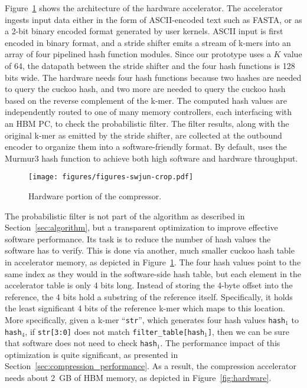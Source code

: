 Figure~\ref{fig:compression_hardware} shows the architecture of the hardware accelerator.
The accelerator ingests input data either in the form of ASCII-encoded text such as FASTA, or as a 2-bit binary encoded format generated by user kernels.
ASCII input is first encoded in binary format, and a stride shifter emits a stream of k-mers into an array of four pipelined hash function modules.
Since our prototype uses a $K$ value of 64, the datapath between the stride shifter and the four hash functions is 128 bits wide.
The hardware needs four hash functions because two hashes are needed to query the cuckoo hash, and two more are needed to query the cuckoo hash based on the reverse complement of the k-mer.
The computed hash values are independently routed to one of many memory controllers, each interfacing with an HBM PC, to check the probabilistic filter.
The filter results, along with the original k-mer as emitted by the stride shifter, are collected at the outbound encoder to organize them into a software-friendly format.
By default, \name{} uses the Murmur3 hash function to achieve both high software and hardware throughput.

\begin{figure}[htb]
    \centering
    \texttt{[image: figures/figures-swjun-crop.pdf]}
    \caption{Hardware portion of the compressor.}
    \label{fig:compression_hardware}
\end{figure}

The probabilistic filter is not part of the algorithm as described in Section~\ref{sec:algorithm}, but a transparent optimization to improve effective software performance.
Its task is to reduce the number of hash values the software has to verify.
This is done via another, much smaller cuckoo hash table in accelerator memory, as depicted in Figure~\ref{fig:compression_hardware}.
The four hash values point to the same index as they would in the software-side hash table, but each element in the accelerator table is only 4 bits long.
Instead of storing the 4-byte offset into the reference, the 4 bits hold a substring of the reference itself.
Specifically, it holds the least significant 4 bits of the reference k-mer which maps to this location.
More specifically, given a k-mer ``\texttt{str}'', which generates four hash values \texttt{hash$_1$} to \texttt{hash$_4$}, if \texttt{str[3:0]} does not match \texttt{filter\_table[hash$_1$]}, then we can be sure that software does not need to check \texttt{hash$_1$}.
The performance impact of this optimization is quite significant, as presented in Section~\ref{sec:compression_performance}.
As a result, the compression accelerator needs about 2~GB of HBM memory, as depicted in Figure~\ref{fig:hardware}.

